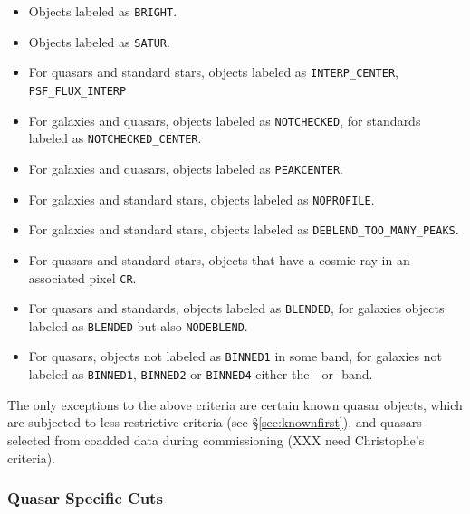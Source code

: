 \documentclass[12pt,preprint]{aastex}
\begin{document}
\begin{itemize}

    \item Objects labeled as \texttt{BRIGHT}.
    \item Objects labeled as \texttt{SATUR}.

    \item For quasars and standard stars, objects
        labeled as \texttt{INTERP\_CENTER}, 
        \texttt{PSF\_FLUX\_INTERP}

    \item For galaxies and quasars, objects labeled
        as \texttt{NOTCHECKED}, for standards labeled
        as \texttt{NOTCHECKED\_CENTER}.

    \item For galaxies and quasars, objects labeled as
        \texttt{PEAKCENTER}.

    \item For galaxies and standard stars, objects labeled
        as \texttt{NOPROFILE}.

    \item For galaxies and standard stars, objects labeled as 
        \texttt{DEBLEND\_TOO\_MANY\_PEAKS}.

    \item For quasars and standard stars, objects that have
        a cosmic ray in an associated pixel \texttt{CR}.
    
    \item For quasars and standards, objects labeled
        as \texttt{BLENDED}, for galaxies objects labeled
        as \texttt{BLENDED} but also \texttt{NODEBLEND}.


    \item For quasars, objects not labeled as \texttt{BINNED1} in some band, 
    for galaxies not labeled as \texttt{BINNED1}, \texttt{BINNED2}
    or \texttt{BINNED4} either the \rmag- or \imag-band.
   
\end{itemize}

The only exceptions to the above criteria are certain known quasar objects,
which are subjected to less restrictive criteria (see \S \ref{sec:knownfirst}),
and quasars selected from coadded data during commissioning (XXX need
Christophe's criteria).

\subsubsection{Quasar Specific Cuts} \label{sec:cutqso}
\end{document}
